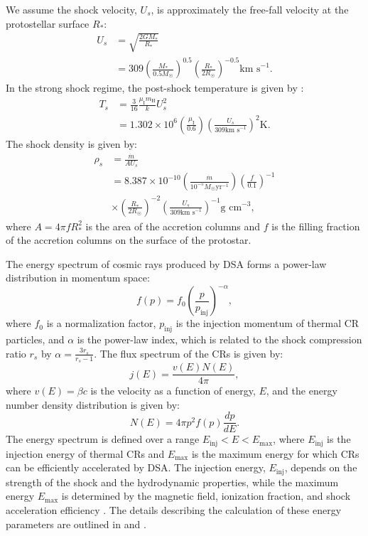 \documentclass[twocolumn]{aastex63}
\def\lp{\left(}
\def\rp{\right)}
\def\t{\text}
\begin{document}
We assume the shock velocity, $U_s$, is approximately the free-fall velocity at the protostellar surface $R_*$:
\begin{align}
    U_s &= \sqrt{\frac{2GM_*}{R_*}} \nonumber \\
    &= 309\lp\frac{M_*}{0.5M_{\astrosun}}\rp^{0.5}\lp\frac{R_*}{2R_{\astrosun}}\rp^{-0.5} \t{km s}^{-1}.
\end{align}
In the strong shock regime, the post-shock temperature is given by \citep{hartmann_2016_accretion}:
\begin{align}
    T_s &= \frac{3}{16}\frac{\mu_{\t{I}}m_{\t{H}}}{k}U_s^2 \nonumber \\
    &= 1.302\times10^6\lp\frac{\mu_{\t{I}}}{0.6}\rp\lp\frac{U_s}{309 \t{km s}^{-1}}\rp^2 \t{K.}
\end{align}
 The shock density is given by:
\begin{align}
    \rho_s &=\frac{\dot{m}}{AU_s} \nonumber \\
    &= 8.387 \times 10^{-10} \lp\frac{\dot{m}}{10^{-5} M_{\astrosun} \t{yr}^{-1}}\rp \lp\frac{f}{0.1}\rp^{-1}
    \nonumber \\
    & \times \lp\frac{R_*}{2R_{\astrosun}}\rp^{-2}\lp\frac{U_s}{309 \t{km s}^{-1}}\rp^{-1} \t{g cm}^{-3},
\end{align}
where $A=4\pi fR_*^2$ is the area of the accretion columns and $f$ is the filling fraction of the accretion columns on the surface of the protostar.

The energy spectrum of cosmic rays produced by DSA forms a power-law distribution in momentum space:
\begin{equation}
    f(p)=f_0\lp\frac{p}{p_{\t{inj}}}\rp^{-\alpha}, 
\label{equation:spectrum_power}
\end{equation}
where $f_0$ is a normalization factor, $p_{\t{inj}}$ is the injection momentum of thermal CR particles, and $\alpha$ is the power-law index, which is related to the shock compression ratio $r_s$ by $\alpha=\frac{3r_s}{r_s-1}$. The flux spectrum of the CRs is given by:
\begin{equation}
    j(E)=\frac{v(E)N(E)}{4\pi}, 
\end{equation}
where $v(E)=\beta c$ is the velocity as a function of energy, $E$, and the energy number density distribution is given by:
\begin{equation}
    N(E)=4\pi p^2 f(p) \frac{dp}{dE}. 
\end{equation}
The energy spectrum is defined over a range $E_{\t{inj}} < E < E_{\t{max}}$, where $E_{\t{inj}}$ is the injection energy of thermal CRs and $E_{\t{max}}$ is the maximum energy for which CRs can be efficiently accelerated by DSA. The injection energy, $E_{\t{inj}}$, depends on the strength of the shock and the hydrodynamic properties, while the maximum energy $E_{\t{max}}$ is determined by the magnetic field, ionization fraction, and shock acceleration efficiency \citep{gaches_2018_exploration}. The details describing the calculation of these energy parameters are outlined in \cite{gaches_2018_exploration} and \cite{padovani_2016_protostars}.
\end{document}
